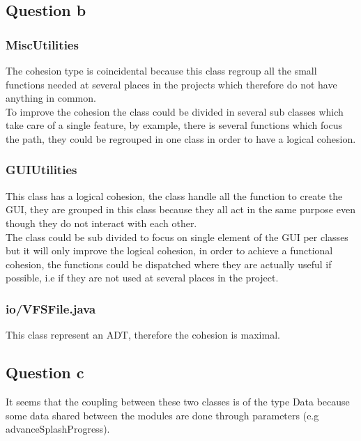 \documentclass[a4paper,10pt]{article}
\begin{document}
\subsection{Question b}
\subsubsection{MiscUtilities}
The cohesion type is coincidental because this class regroup all the small functions needed at several places in the projects which therefore do not have anything in common.\\
To improve the cohesion the class could be divided in several sub classes which take care of a single feature, by example, there is several functions which focus the path, they could be regrouped in one class in order to have a logical cohesion.
\subsubsection{GUIUtilities}
This class has a logical cohesion, the class handle all the function to create the GUI, they are grouped in this class because they all act in the same purpose even though they do not interact with each other.\\
The class could be sub divided to focus on single element of the GUI per classes but it will only improve the logical cohesion, in order to achieve a functional cohesion, the functions could be dispatched where they are actually useful if possible, i.e if they are not used at several places in the project.
\subsubsection{io/VFSFile.java}
This class represent an ADT, therefore the cohesion is maximal.
\subsection{Question c}
It seems that the coupling between these two classes is of the type Data because some data shared between the modules are done through parameters (e.g advanceSplashProgress).
\end{document}
